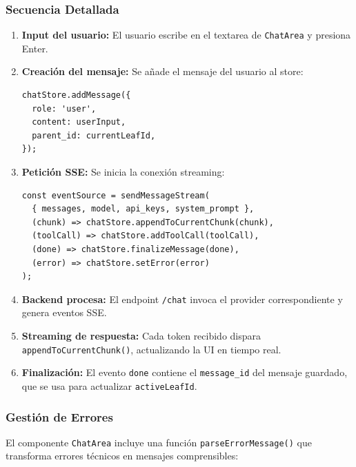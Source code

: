 \subsubsection{Secuencia Detallada}

\begin{enumerate}
    \item \textbf{Input del usuario:} El usuario escribe en el textarea de \texttt{ChatArea} y presiona Enter.
    
    \item \textbf{Creación del mensaje:} Se añade el mensaje del usuario al store:
    \begin{verbatim}
chatStore.addMessage({
  role: 'user',
  content: userInput,
  parent_id: currentLeafId,
});
    \end{verbatim}
    
    \item \textbf{Petición SSE:} Se inicia la conexión streaming:
    \begin{verbatim}
const eventSource = sendMessageStream(
  { messages, model, api_keys, system_prompt },
  (chunk) => chatStore.appendToCurrentChunk(chunk),
  (toolCall) => chatStore.addToolCall(toolCall),
  (done) => chatStore.finalizeMessage(done),
  (error) => chatStore.setError(error)
);
    \end{verbatim}
    
    \item \textbf{Backend procesa:} El endpoint \texttt{/chat} invoca el provider correspondiente y genera eventos SSE.
    
    \item \textbf{Streaming de respuesta:} Cada token recibido dispara \texttt{appendToCurrentChunk()}, actualizando la UI en tiempo real.
    
    \item \textbf{Finalización:} El evento \texttt{done} contiene el \texttt{message\_id} del mensaje guardado, que se usa para actualizar \texttt{activeLeafId}.
\end{enumerate}

\subsubsection{Gestión de Errores}

El componente \texttt{ChatArea} incluye una función \texttt{parseErrorMessage()} que transforma errores técnicos en mensajes comprensibles:

